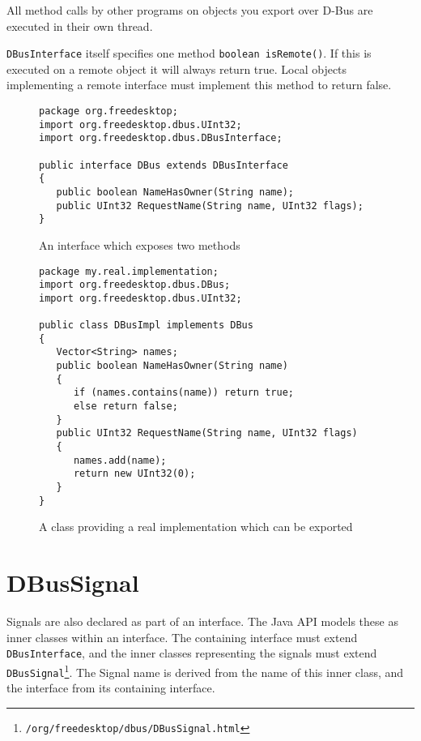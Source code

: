 \documentclass[a4paper,12pt]{article}
\begin{document}
All method calls by other programs on objects you export over D-Bus
are executed in their own thread.

{\tt DBusInterface} itself specifies one method \verb&boolean isRemote()&. If
this is executed on a remote object it will always return true. Local objects
implementing a remote interface must implement this method to return false.

\begin{figure}[htb]
\begin{center}
\begin{verbatim}
package org.freedesktop;
import org.freedesktop.dbus.UInt32;
import org.freedesktop.dbus.DBusInterface;

public interface DBus extends DBusInterface
{
   public boolean NameHasOwner(String name);
   public UInt32 RequestName(String name, UInt32 flags);
}
\end{verbatim}
\end{center}
\caption{An interface which exposes two methods}
\label{fig:interface}
\end{figure}

\begin{figure}[htb]
\begin{center}
\begin{verbatim}
package my.real.implementation;
import org.freedesktop.dbus.DBus;
import org.freedesktop.dbus.UInt32;

public class DBusImpl implements DBus
{
   Vector<String> names;
   public boolean NameHasOwner(String name)
   {
      if (names.contains(name)) return true;
      else return false;
   }
   public UInt32 RequestName(String name, UInt32 flags)
   {
      names.add(name);
      return new UInt32(0);
   }
}
\end{verbatim}
\end{center}
\caption{A class providing a real implementation which can be exported}
\label{fig:class}
\end{figure}

\section{DBusSignal}

Signals are also declared as part of an interface. The Java API
models these as inner classes within an interface. The containing
interface must extend {\tt DBusInterface}, and the inner classes
representing the signals must extend {\tt
DBusSignal\footnote{\javadocroot/org/freedesktop/dbus/DBusSignal.html}}.
The Signal name is derived from the name of this inner class, and
the interface from its containing interface.
\end{document}
